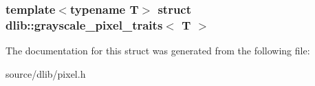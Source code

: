 \subsubsection*{template$<$typename T$>$ struct dlib::grayscale\_\-pixel\_\-traits$<$ T $>$}



The documentation for this struct was generated from the following file:\begin{DoxyCompactItemize}
\item 
source/dlib/pixel.h\end{DoxyCompactItemize}
